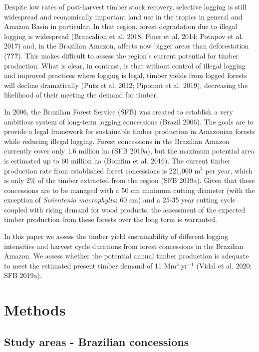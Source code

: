 \documentclass[
]{article}
\begin{document}
Despite low rates of post-harvest timber stock recovery, selective logging is still widespread and economically important land use in the tropics in general and Amazon Basin in particular. In that region, forest degradation due to illegal logging is widespread (Brancalion et al. 2018; Finer et al. 2014; Potapov et al. 2017) and, in the Brazilian Amazon, affects now bigger areas than deforestation ({\textbf{???}}). This makes difficult to assess the region's current potential for timber production. What is clear, in contrast, is that without control of illegal logging and improved practices where logging is legal, timber yields from logged forests will decline dramatically (Putz et al. 2012; Piponiot et al. 2019), decreasing the likelihood of their meeting the demand for timber.

In 2006, the Brazilian Forest Service (SFB) was created to establish a very ambitious system of long-term logging concessions (Brazil 2006). The goals are to provide a legal framework for sustainable timber production in Amazonian forests while reducing illegal logging. Forest concessions in the Brazilian Amazon currently cover only 1.6 million ha (SFB 2019a), but the maximum potential area is estimated up to 60 million ha (Bomfim et al. 2016). The current timber production rate from established forest concessions is 221,000 m\(^3\) per year, which is only 2\% of the timber extracted from the region (SFB 2019a). Given that these concessions are to be managed with a 50 cm minimum cutting diameter (with the exception of \emph{Swientenia macrophylla}: 60 cm) and a 25-35 year cutting cycle coupled with rising demand for wood products, the assessment of the expected timber production from these forests over the long term is warranted.

In this paper we assess the timber yield sustainability of different logging intensities and harvest cycle durations from forest concessions in the Brazilian Amazon. We assess whether the potential annual timber production is adequate to meet the estimated present timber demand of 11 Mm\(^3\).yr\(^{-1}\) (Vidal et al. 2020; SFB 2019a).

\hypertarget{methods}{%
\section{Methods}\label{methods}}

\hypertarget{study-areas---brazilian-concessions}{%
\subsection{Study areas - Brazilian concessions}\label{study-areas---brazilian-concessions}}
\end{document}
